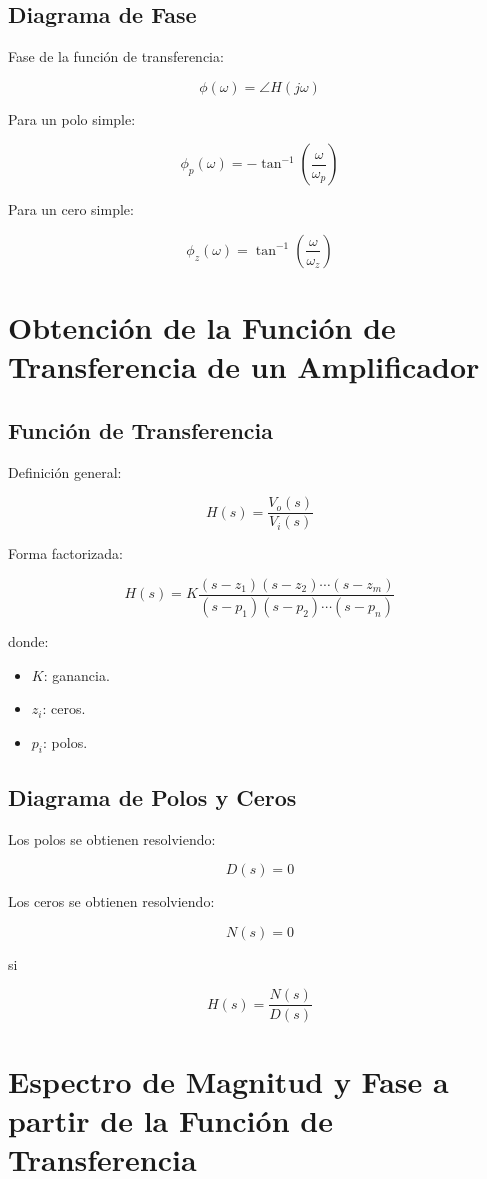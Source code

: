 \documentclass{article}
\begin{document}
\subsection{Diagrama de Fase}

Fase de la función de transferencia:

$$
\phi(\omega)=\angle H(j\omega)
$$

Para un polo simple:

$$
\phi_p(\omega)=-\tan^{-1}\left(\frac{\omega}{\omega_p}\right)
$$

Para un cero simple:

$$
\phi_z(\omega)=\tan^{-1}\left(\frac{\omega}{\omega_z}\right)
$$

\section{Obtención de la Función de Transferencia de un Amplificador}

\subsection{Función de Transferencia}

Definición general:

$$
H(s)=\frac{V_o(s)}{V_i(s)}
$$

Forma factorizada:

$$
H(s)=K
\frac{(s-z_1)(s-z_2)\cdots(s-z_m)}
{(s-p_1)(s-p_2)\cdots(s-p_n)}
$$

donde:

\begin{itemize}
\item $K$: ganancia.
\item $z_i$: ceros.
\item $p_i$: polos.
\end{itemize}

\subsection{Diagrama de Polos y Ceros}

Los polos se obtienen resolviendo:

$$
D(s)=0
$$

Los ceros se obtienen resolviendo:

$$
N(s)=0
$$

si

$$
H(s)=\frac{N(s)}{D(s)}
$$

\section{Espectro de Magnitud y Fase a partir de la Función de Transferencia}
\end{document}
